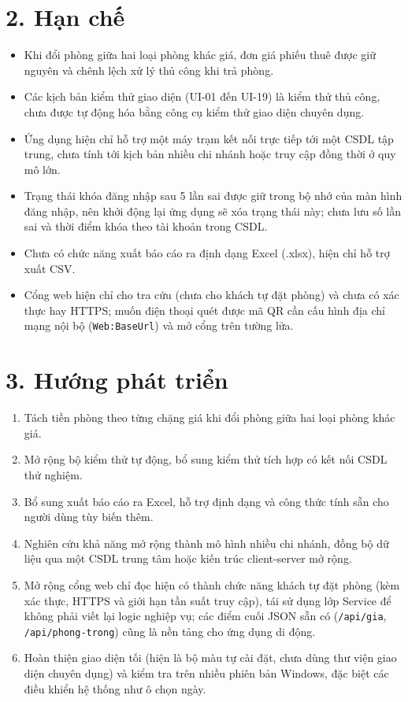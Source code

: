 \documentclass[14pt]{report}
\begin{document}
\section*{2. Hạn chế}

\begin{itemize}
  \item Khi đổi phòng giữa hai loại phòng khác giá, đơn giá phiếu thuê được giữ nguyên và chênh lệch xử lý thủ công khi trả phòng.
  \item Các kịch bản kiểm thử giao diện (UI-01 đến UI-19) là kiểm thử thủ công, chưa được tự động hóa bằng công cụ kiểm thử giao diện chuyên dụng.
  \item Ứng dụng hiện chỉ hỗ trợ một máy trạm kết nối trực tiếp tới một CSDL tập trung, chưa tính tới kịch bản nhiều chi nhánh hoặc truy cập đồng thời ở quy mô lớn.
  \item Trạng thái khóa đăng nhập sau 5 lần sai được giữ trong bộ nhớ của màn hình đăng nhập, nên khởi động lại ứng dụng sẽ xóa trạng thái này; chưa lưu số lần sai và thời điểm khóa theo tài khoản trong CSDL.
  \item Chưa có chức năng xuất báo cáo ra định dạng Excel (.xlsx), hiện chỉ hỗ trợ xuất CSV.
  \item Cổng web hiện chỉ cho tra cứu (chưa cho khách tự đặt phòng) và chưa có xác thực hay HTTPS; muốn điện thoại quét được mã QR cần cấu hình địa chỉ mạng nội bộ (\texttt{Web:BaseUrl}) và mở cổng trên tường lửa.
\end{itemize}

\section*{3. Hướng phát triển}

\begin{enumerate}
  \item Tách tiền phòng theo từng chặng giá khi đổi phòng giữa hai loại phòng khác giá.
  \item Mở rộng bộ kiểm thử tự động, bổ sung kiểm thử tích hợp có kết nối CSDL thử nghiệm.
  \item Bổ sung xuất báo cáo ra Excel, hỗ trợ định dạng và công thức tính sẵn cho người dùng tùy biến thêm.
  \item Nghiên cứu khả năng mở rộng thành mô hình nhiều chi nhánh, đồng bộ dữ liệu qua một CSDL trung tâm hoặc kiến trúc client-server mở rộng.
  \item Mở rộng cổng web chỉ đọc hiện có thành chức năng khách tự đặt phòng (kèm xác thực, HTTPS và giới hạn tần suất truy cập), tái sử dụng lớp Service để không phải viết lại logic nghiệp vụ; các điểm cuối JSON sẵn có (\texttt{/api/gia}, \texttt{/api/phong-trong}) cũng là nền tảng cho ứng dụng di động.
  \item Hoàn thiện giao diện tối (hiện là bộ màu tự cài đặt, chưa dùng thư viện giao diện chuyên dụng) và kiểm tra trên nhiều phiên bản Windows, đặc biệt các điều khiển hệ thống như ô chọn ngày.
\end{enumerate}
\end{document}
